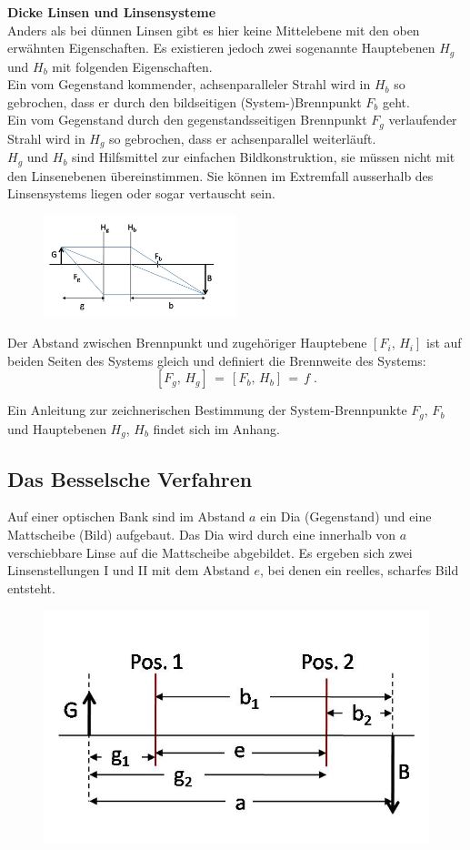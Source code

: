 \noindent
\textbf{Dicke Linsen und Linsensysteme}\\
Anders als bei dünnen Linsen gibt es hier keine Mittelebene mit den oben erwähnten Eigenschaften. Es existieren jedoch zwei sogenannte Hauptebenen $H_g$ und $H_b$ mit folgenden Eigenschaften.\\
Ein vom Gegenstand kommender, achsenparalleler Strahl wird in $H_b$ so gebrochen, dass er durch den bildseitigen (System-)Brennpunkt $F_b$ geht.\\
Ein vom Gegenstand durch den gegenstandsseitigen Brennpunkt $F_g$ verlaufender Strahl wird in $H_g$ so gebrochen, dass er achsenparallel weiterläuft.\\
$H_g$ und $H_b$ sind Hilfsmittel zur einfachen Bildkonstruktion, sie müssen nicht mit den Linsenebenen übereinstimmen. Sie können im Extremfall ausserhalb des Linsensystems liegen oder sogar vertauscht sein. 
\begin{figure}[h]
	\centering
		\includegraphics[width=0.5\textwidth]{Abbildungen/dicke_linse.jpg}
	\label{fig:dicke_linse}
\end{figure}

Der Abstand zwischen Brennpunkt und zugehöriger Hauptebene $\left[F_i,\,H_i\right]$ ist auf beiden Seiten des Systems gleich und definiert die Brennweite des Systems:
\[
\left[F_g,\,H_g\right]\,=\,\left[F_b,\,H_b\right]\,=\, f\; .
\]

\noindent
Ein Anleitung zur zeichnerischen Bestimmung der System-Brennpunkte $F_g$, $F_b$ und Hauptebenen $H_g$, $H_b$ findet sich im Anhang.

\subsection{Das Besselsche Verfahren}

Auf einer optischen Bank sind im Abstand $a$ ein Dia (Gegenstand) und eine Mattscheibe (Bild) aufgebaut. Das Dia wird durch eine innerhalb von $a$ verschiebbare Linse auf die Mattscheibe abgebildet. Es ergeben sich zwei Linsenstellungen I und II mit dem Abstand $e$, bei denen ein reelles, scharfes Bild entsteht.\\
\begin{figure}[h]
	\centering
		\includegraphics[width=0.5\linewidth]{Abbildungen/bessel_neu.jpg}
	\label{fig:bessel}
\end{figure}

